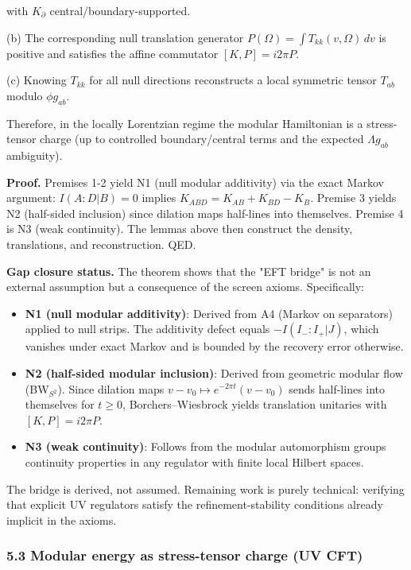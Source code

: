 with \(K_\partial\) central/boundary-supported.

(b) The corresponding null translation generator \(P(\Omega) = \int T_{kk}(v,\Omega) \, dv\) is positive and satisfies the affine commutator \([K,P] = i 2\pi P\).

(c) Knowing \(T_{kk}\) for all null directions reconstructs a local symmetric tensor \(T_{ab}\) modulo \(\phi g_{ab}\).

Therefore, in the locally Lorentzian regime the modular Hamiltonian is a stress-tensor charge (up to controlled boundary/central terms and the expected \(\Lambda g_{ab}\) ambiguity).

\textbf{Proof.} Premises 1-2 yield N1 (null modular additivity) via the exact Markov argument: \(I(A:D|B)=0\) implies \(K_{ABD} = K_{AB} + K_{BD} - K_B\). Premise 3 yields N2 (half-sided inclusion) since dilation maps half-lines into themselves. Premise 4 is N3 (weak continuity). The lemmas above then construct the density, translations, and reconstruction. QED.

\textbf{Gap closure status.} The theorem shows that the "EFT bridge" is not an external assumption but a consequence of the screen axioms. Specifically:

\begin{itemize}
\item
  \textbf{N1 (null modular additivity)}: Derived from A4 (Markov on separators) applied to null strips. The additivity defect equals \(-I(I_-:I_+|J)\), which vanishes under exact Markov and is bounded by the recovery error otherwise.
\item
  \textbf{N2 (half-sided modular inclusion)}: Derived from geometric modular flow (BW\(_{S^2}\)). Since dilation maps \(v - v_0 \mapsto e^{-2\pi t}(v - v_0)\) sends half-lines into themselves for \(t \ge 0\), Borchers--Wiesbrock yields translation unitaries with \([K, P] = i2\pi P\).
\item
  \textbf{N3 (weak continuity)}: Follows from the modular automorphism group\textquotesingle s continuity properties in any regulator with finite local Hilbert spaces.
\end{itemize}

The bridge is derived, not assumed. Remaining work is purely technical: verifying that explicit UV regulators satisfy the refinement-stability conditions already implicit in the axioms.

\subsubsection{5.3 Modular energy as stress-tensor charge (UV CFT)}\label{53-modular-energy-as-stress-tensor-charge-uv-cft}

